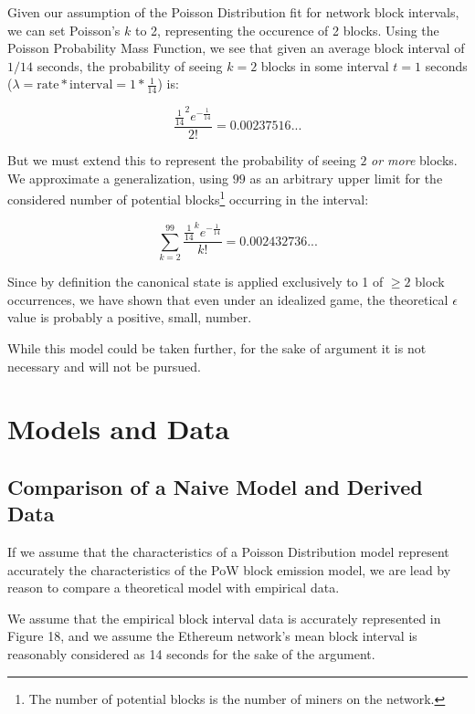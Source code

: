 \documentclass[11pt]{article}
\theoremstyle{plain}
\begin{document}
Given our assumption of the Poisson Distribution fit for network block
intervals, we can set Poisson's $k$ to 2, representing the occurence of 2
blocks.
Using the Poisson Probability Mass Function, we see that given an average block
interval of $1/14$ seconds, the probability of seeing $k=2$ blocks in some
interval $t=1$ seconds
($\lambda=\mathrm{rate}*\mathrm{interval}=1*\frac{1}{14}$) is:

\begin{equation}
  \frac{\frac{1}{14}^{2}e^{-\frac{1}{14}}}{2!} = 0.00237516...
\end{equation}

But we must extend this to represent the probability of seeing $2$ \emph{or
more} blocks.
We approximate a generalization, using $99$ as an arbitrary upper limit for the
considered number of potential blocks\footnote{The number of potential blocks
is the number of miners on the network.} occurring in the interval:

\begin{equation}
  \sum_{k=2}^{99}\frac{\frac{1}{14}^{k}e^{-\frac{1}{14}}}{k!} = 0.002432736...
\end{equation}

Since by definition the canonical state is applied exclusively to 1 of
$\geq 2$ block occurrences, we have shown that even under an idealized game,
the theoretical $\epsilon$ value is probably a positive, small, number.

While this model could be taken further, for the sake of argument it is not
necessary and will not be pursued.


\section{\normalsize{Models and Data}}

\subsection{\normalsize{Comparison of a Naive Model and Derived Data}}

If we assume that the characteristics of a Poisson Distribution model represent
accurately the characteristics of the PoW block emission model,
we are lead by reason to compare a theoretical model with empirical data.

We assume that the empirical block interval data is accurately represented in
Figure 18,
and we assume the Ethereum network's mean block interval is reasonably
considered as 14 seconds for the sake of the argument.
\end{document}

